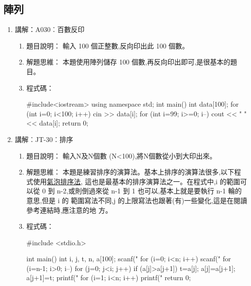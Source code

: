 \subsection{陣列}
\begin{enumerate}
	\item 講解：A030︰百數反印
		\begin{enumerate}
			\item 題目說明：
			\subitem 輸入 100 個正整數,反向印出此 100 個數。
			
			\item 解題思維：
			\subitem 本題使用陣列儲存 100 個數,再反向印出即可,是很基本的題目。
			
			\item 程式碼：
			\begin{cppcode}
				#include<iostream>
				using namespace std;
				int main()
				{
					int data[100];
					for (int i=0; i<100; i++) cin >> data[i];
					for (int i=99; i>=0; i--) cout << " " << data[i];
					return 0;
				}
			\end{cppcode}
		\end{enumerate}
	
	\item 講解︰JT-30︰排序
		\begin{enumerate}
			\item 題目說明：
			\subitem 輸入N及N個數 (N<100),將N個數從小到大印出來。
			
			\item 解題思維：
			\subitem 本題是練習排序的演算法。基本上排序的演算法很多,以下程式使用\href{https://zh.wikipedia.org/wiki/%E5%86%92%E6%B3%A1%E6%8E%92%E5%BA%8F}{氣泡排序法},
			這也是最基本的排序演算法之一。在程式中,i 的範圍可以從 0
			到 n-2,或則倒過來從 n-1 到 1 也可以,基本上就是要執行 n-1 輪的意思,但是 i 的
			範圍寫法不同,j 的上限寫法也跟著(有)一些變化,這是在閱讀參考連結時,應注意的地
			方。
			
			\item 程式碼：
			\begin{cppcode}
				#include <stdio.h>
			
				int main()
				{
					int i, j, t, n, a[100];
					scanf("%
					for (i=0; i<n; i++) scanf("%
					for (i=n-1; i>0; i--) {
						for (j=0; j<i; j++) {
							if (a[j]>a[j+1]) {
								t=a[j];
								a[j]=a[j+1];
								a[j+1]=t;
							}
						}
					}
					printf("%
					for (i=1; i<n; i++) printf(" %
					return 0;
				}
			\end{cppcode}
		\end{enumerate}
	
\end{enumerate}

